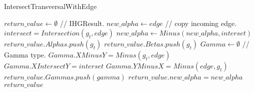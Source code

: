 \begin{algorithm}
	\caption{IntersectTransversalWithEdge}\label{IntersectTransversalWithEdge}
	\begin{algorithmic}[1]
		\State $return\_value \gets \emptyset$ // IHGResult.
		\State $new\_alpha \gets edge$ // copy incoming edge.
		\State $intersect = Intersection(g_t,edge)$
		\State $new\_alpha \gets Minus(new\_alpha,interset)$
		\State $return\_value.Alphas.push(g_t)$
		\Else
		\State $return\_value.Betas.push(g_t)$		
		\Else
		\State $Gamma \gets \emptyset$ // Gamma type.
		\State $Gamma.XMinusY = Minus(g_t,edge)$
		\State $Gamma.XIntersectY = interset$
		\State $Gamma.YMinusX = Minus(edge,g_t)$
		\State $return\_value.Gammas.push(gamma)$
		\EndIf
		\EndIf
		\EndFor
		\State $return\_value.new\_alpha = new\_alpha$
		\State \Return $return\_value$
		\EndFunction
	\end{algorithmic}
\end{algorithm}

